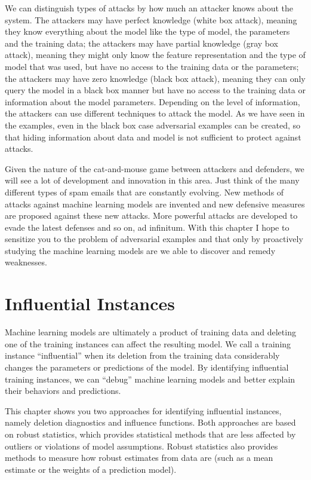 \documentclass[
  11pt,
]{scrbook}
\begin{document}
We can distinguish types of attacks by how much an attacker knows about the system.
The attackers may have perfect knowledge (white box attack), meaning they know everything about the model like the type of model, the parameters and the training data;
the attackers may have partial knowledge (gray box attack), meaning they might only know the feature representation and the type of model that was used, but have no access to the training data or the parameters;
the attackers may have zero knowledge (black box attack), meaning they can only query the model in a black box manner but have no access to the training data or information about the model parameters.
Depending on the level of information, the attackers can use different techniques to attack the model.
As we have seen in the examples, even in the black box case adversarial examples can be created, so that hiding information about data and model is not sufficient to protect against attacks.

Given the nature of the cat-and-mouse game between attackers and defenders, we will see a lot of development and innovation in this area.
Just think of the many different types of spam emails that are constantly evolving.
New methods of attacks against machine learning models are invented and new defensive measures are proposed against these new attacks.
More powerful attacks are developed to evade the latest defenses and so on, ad infinitum.
With this chapter I hope to sensitize you to the problem of adversarial examples and that only by proactively studying the machine learning models are we able to discover and remedy weaknesses.

\newpage

\hypertarget{influential}{%
\section{Influential Instances}\label{influential}}

Machine learning models are ultimately a product of training data and deleting one of the training instances can affect the resulting model.
We call a training instance ``influential'' when its deletion from the training data considerably changes the parameters or predictions of the model.
By identifying influential training instances, we can ``debug'' machine learning models and better explain their behaviors and predictions.

This chapter shows you two approaches for identifying influential instances, namely deletion diagnostics and influence functions.
Both approaches are based on robust statistics, which provides statistical methods that are less affected by outliers or violations of model assumptions.
Robust statistics also provides methods to measure how robust estimates from data are (such as a mean estimate or the weights of a prediction model).
\end{document}
